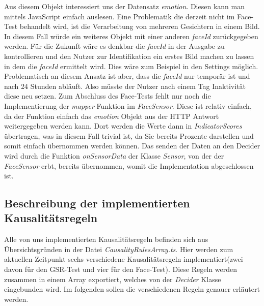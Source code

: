 Aus diesem Objekt interessiert uns der Datensatz \textit{emotion}. Diesen kann man mittels JavaScript einfach auslesen. Eine Problematik die derzeit nicht im Face-Test behandelt wird, ist die Verarbeitung von mehreren Gesichtern in einem Bild. In diesem Fall würde ein weiteres Objekt mit einer anderen \textit{faceId} zurückgegeben werden. Für die Zukunft wäre es denkbar die \textit{faceId} in der Ausgabe zu kontrollieren und den Nutzer zur Identifikation ein erstes Bild machen zu lassen in dem die \textit{faceId} ermittelt wird. Dies wäre zum Beispiel in den Settings möglich. Problematisch an diesem Ansatz ist aber, dass die \textit{faceId} nur temporär ist und nach 24 Stunden abläuft. Also müsste der Nutzer nach einem Tag Inaktivität diese neu setzen.\newline
Zum Abschluss des Face-Tests fehlt nur noch die Implementierung der \textit{mapper} Funktion im \textit{FaceSensor}. Diese ist relativ einfach, da der Funktion einfach das \textit{emotion} Objekt aus der HTTP Antwort weitergegeben werden kann. Dort werden die Werte dann in \textit{IndicatorScores} übertragen, was in diesem Fall trivial ist, da Sie bereits Prozente darstellen und somit einfach übernommen werden können. Das senden der Daten an den Decider wird durch die Funktion \textit{onSensorData} der Klasse \textit{Sensor}, von der der \textit{FaceSensor} erbt, bereits übernommen, womit die Implementation abgeschlossen ist.   
\subsection{Beschreibung der implementierten Kausalitätsregeln}
Alle von uns implementierten Kausalitätsregeln befinden sich aus Übersichtsgründen in der Datei \textit{CausalityRulesArray.ts}. Hier werden zum aktuellen Zeitpunkt sechs verschiedene Kausalitätsregeln implementiert(zwei davon für den GSR-Test und vier für den Face-Test). Diese Regeln werden zusammen in einem Array exportiert, welches von der \textit{Decider} Klasse eingebunden wird. Im folgenden sollen die verschiedenen Regeln genauer erläutert werden.
